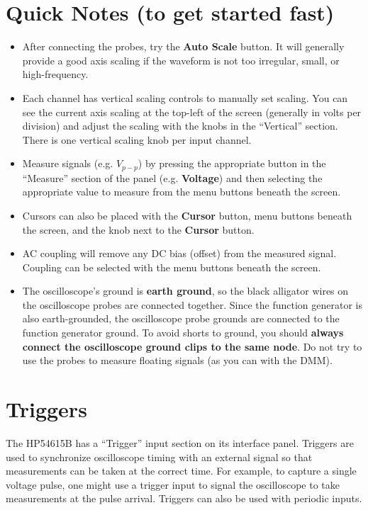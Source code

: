 \documentclass{article}
\begin{document}
\section{Quick Notes (to get started fast)}
\begin{itemize}
\item After connecting the probes, try the \textbf{Auto Scale} button. It will generally provide a good axis scaling if the waveform is not too irregular, small, or high-frequency.
\item Each channel has vertical scaling controls to manually set scaling. You can see the current axis scaling at the top-left of the screen (generally in volts per division) and adjust the scaling with the knobs in the ``Vertical'' section. There is one vertical scaling knob per input channel.
\item Measure signals (e.g. $V_{p-p}$) by pressing the appropriate button in the ``Measure'' section of the panel (e.g. \textbf{Voltage}) and then selecting the appropriate value to measure from the menu buttons beneath the screen.
\item Cursors can also be placed with the \textbf{Cursor} button, menu buttons beneath the screen, and the knob next to the \textbf{Cursor} button.
\item AC coupling will remove any DC bias (offset) from the measured signal. Coupling can be selected with the menu buttons beneath the screen.
\item The oscilloscope's ground is \textbf{earth ground}, so the black alligator wires on the oscilloscope probes are connected together. Since the function generator is also earth-grounded, the oscilloscope probe grounds are connected to the function generator ground. To avoid shorts to ground, you should \textbf{always connect the oscilloscope ground clips to the same node}. Do not try to use the probes to measure floating signals (as you can with the DMM).
\end{itemize}

\section{Triggers}
The HP54615B has a ``Trigger'' input section on its interface panel. Triggers are used to synchronize oscilloscope timing with an external signal so that measurements can be taken at the correct time. For example, to capture a single voltage pulse, one might use a trigger input to signal the oscilloscope to take measurements at the pulse arrival. Triggers can also be used with periodic inputs.
\end{document}
